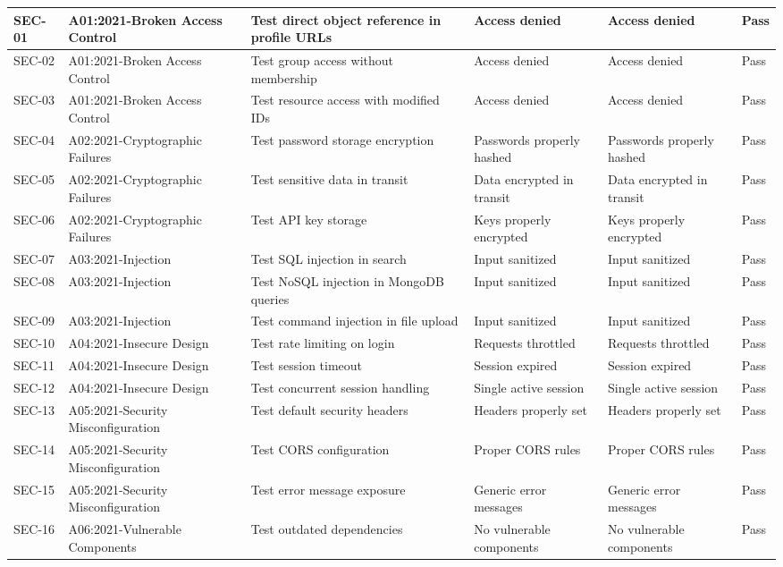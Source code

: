 {\begin{longtable}{|C{1.5cm}|C{2.5cm}|C{3cm}|C{2cm}|C{2cm}|C{1cm}|}
SEC-01 & A01:2021-Broken Access Control & Test direct object reference in profile URLs & Access denied & Access denied & Pass \\
\hline
SEC-02 & A01:2021-Broken Access Control & Test group access without membership & Access denied & Access denied & Pass \\
\hline
SEC-03 & A01:2021-Broken Access Control & Test resource access with modified IDs & Access denied & Access denied & Pass \\
\hline
SEC-04 & A02:2021-Cryptographic Failures & Test password storage encryption & Passwords properly hashed & Passwords properly hashed & Pass \\
\hline
SEC-05 & A02:2021-Cryptographic Failures & Test sensitive data in transit & Data encrypted in transit & Data encrypted in transit & Pass \\
\hline
SEC-06 & A02:2021-Cryptographic Failures & Test API key storage & Keys properly encrypted & Keys properly encrypted & Pass \\
\hline
SEC-07 & A03:2021-Injection & Test SQL injection in search & Input sanitized & Input sanitized & Pass \\
\hline
SEC-08 & A03:2021-Injection & Test NoSQL injection in MongoDB queries & Input sanitized & Input sanitized & Pass \\
\hline
SEC-09 & A03:2021-Injection & Test command injection in file upload & Input sanitized & Input sanitized & Pass \\
\hline
SEC-10 & A04:2021-Insecure Design & Test rate limiting on login & Requests throttled & Requests throttled & Pass \\
\hline
SEC-11 & A04:2021-Insecure Design & Test session timeout & Session expired & Session expired & Pass \\
\hline
SEC-12 & A04:2021-Insecure Design & Test concurrent session handling & Single active session & Single active session & Pass \\
\hline
SEC-13 & A05:2021-Security Misconfiguration & Test default security headers & Headers properly set & Headers properly set & Pass \\
\hline
SEC-14 & A05:2021-Security Misconfiguration & Test CORS configuration & Proper CORS rules & Proper CORS rules & Pass \\
\hline
SEC-15 & A05:2021-Security Misconfiguration & Test error message exposure & Generic error messages & Generic error messages & Pass \\
\hline
SEC-16 & A06:2021-Vulnerable Components & Test outdated dependencies & No vulnerable components & No vulnerable components & Pass \\

\end{longtable}}
